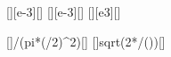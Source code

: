 [\milli\W][e-3][\W]
[\milli\m][e-3][\m]
[\kilo\W\per\m\squared][e3][\W\per\m\squared]

[]{\PlX/(pi*(\dbX/2)^2)}[\W\per\m\squared]
[]{sqrt(2*\IbX/(\nccX*\ncepsX))}[\V\per\m]
